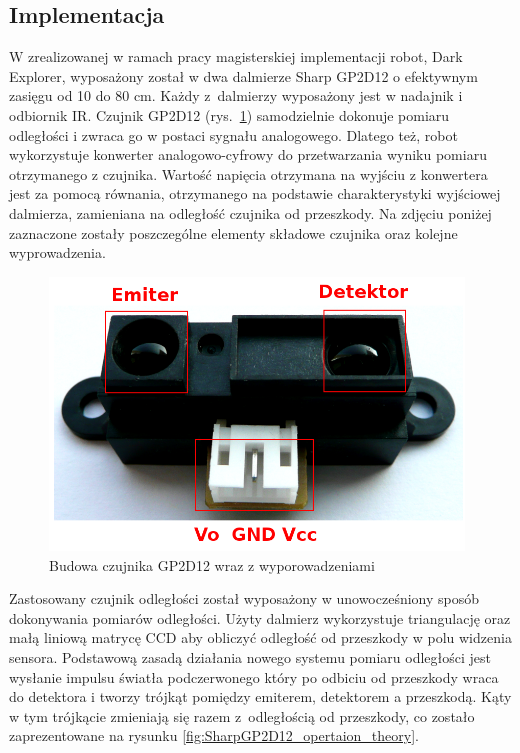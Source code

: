\subsection{Implementacja}
W zrealizowanej w ramach pracy magisterskiej implementacji robot, Dark Explorer,
wyposażony został w dwa dalmierze Sharp GP2D12 o efektywnym zasięgu od 10 do 80
cm. Każdy z~dalmierzy wyposażony jest w nadajnik i odbiornik IR. Czujnik
GP2D12 (rys.~\ref{fig:SharpGP2D12}) samodzielnie dokonuje pomiaru odległości i
zwraca go w postaci sygnału analogowego. Dlatego też, robot wykorzystuje konwerter analogowo-cyfrowy do
przetwarzania wyniku pomiaru otrzymanego z czujnika. Wartość napięcia otrzymana
na wyjściu z konwertera jest za pomocą równania, otrzymanego na podstawie
charakterystyki wyjściowej dalmierza, zamieniana na odległość czujnika od
przeszkody. Na zdjęciu poniżej zaznaczone zostały poszczególne elementy składowe
czujnika oraz kolejne wyprowadzenia.

\begin{figure}[hb]
 \centering
 \includegraphics[width=110mm]{../images/ch04/real_gp2d12_view.png}
 \caption{Budowa czujnika GP2D12 wraz z wyporowadzeniami}
 \label{fig:SharpGP2D12}
\end{figure}

Zastosowany czujnik odległości został wyposażony w unowocześniony sposób
dokonywania pomiarów odległości. Użyty dalmierz wykorzystuje triangulację oraz
małą liniową matrycę CCD aby obliczyć odległość od przeszkody w polu
widzenia sensora\cite{website:acroname-robotics}. Podstawową zasadą działania
nowego systemu pomiaru odległości jest wysłanie impulsu światła podczerwonego który po odbiciu od przeszkody wraca
do detektora i tworzy trójkąt pomiędzy emiterem, detektorem a przeszkodą. Kąty w
tym trójkącie zmieniają się razem z~odległością od przeszkody, co zostało
zaprezentowane na rysunku \ref{fig:SharpGP2D12_opertaion_theory}.

